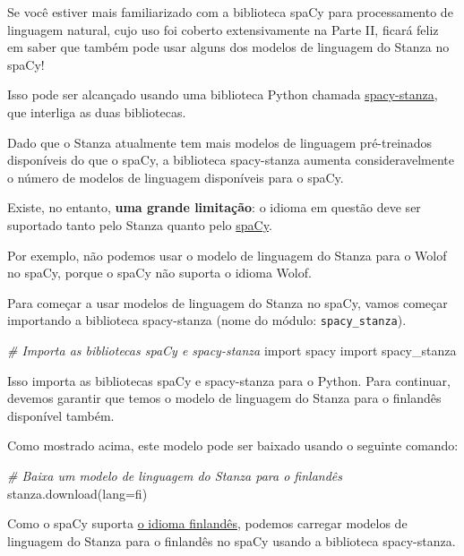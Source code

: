 \documentclass[
  brazilian,
]{article}
\newenvironment{Shaded}{}{}
\newcommand{\CommentTok}[1]{\textcolor[rgb]{0.38,0.63,0.69}{\textit{#1}}}
\newcommand{\ImportTok}[1]{#1}
\newcommand{\NormalTok}[1]{#1}
\newcommand{\OperatorTok}[1]{\textcolor[rgb]{0.40,0.40,0.40}{#1}}
\newcommand{\StringTok}[1]{\textcolor[rgb]{0.25,0.44,0.63}{#1}}
\begin{document}
Se você estiver mais familiarizado com a biblioteca spaCy para
processamento de linguagem natural, cujo uso foi coberto extensivamente
na Parte II, ficará feliz em saber que também pode usar alguns dos
modelos de linguagem do Stanza no spaCy!

Isso pode ser alcançado usando uma biblioteca Python chamada
\href{https://spacy.io/universe/project/spacy-stanza}{spacy-stanza}, que
interliga as duas bibliotecas.

Dado que o Stanza atualmente tem mais modelos de linguagem pré-treinados
disponíveis do que o spaCy, a biblioteca spacy-stanza aumenta
consideravelmente o número de modelos de linguagem disponíveis para o
spaCy.

Existe, no entanto, \textbf{uma grande limitação}: o idioma em questão
deve ser suportado tanto pelo Stanza quanto pelo
\href{https://spacy.io/usage/models\#languages}{spaCy}.

Por exemplo, não podemos usar o modelo de linguagem do Stanza para o
Wolof no spaCy, porque o spaCy não suporta o idioma Wolof.

Para começar a usar modelos de linguagem do Stanza no spaCy, vamos
começar importando a biblioteca spacy-stanza (nome do módulo:
\texttt{spacy\_stanza}).

\begin{Shaded}
\begin{Highlighting}[]
\CommentTok{\# Importa as bibliotecas spaCy e spacy{-}stanza}
\ImportTok{import}\NormalTok{ spacy}
\ImportTok{import}\NormalTok{ spacy\_stanza}
\end{Highlighting}
\end{Shaded}

Isso importa as bibliotecas spaCy e spacy-stanza para o Python. Para
continuar, devemos garantir que temos o modelo de linguagem do Stanza
para o finlandês disponível também.

Como mostrado acima, este modelo pode ser baixado usando o seguinte
comando:

\begin{Shaded}
\begin{Highlighting}[]
\CommentTok{\# Baixa um modelo de linguagem do Stanza para o finlandês}
\NormalTok{stanza.download(lang}\OperatorTok{=}\StringTok{\textquotesingle{}fi\textquotesingle{}}\NormalTok{)}
\end{Highlighting}
\end{Shaded}

Como o spaCy suporta \href{https://spacy.io/usage/models\#languages}{o
idioma finlandês}, podemos carregar modelos de linguagem do Stanza para
o finlandês no spaCy usando a biblioteca spacy-stanza.
\end{document}
